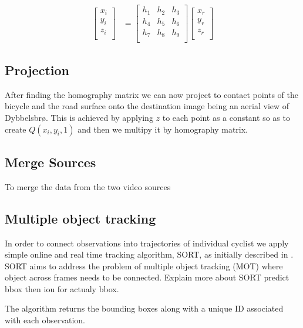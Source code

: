 \documentclass[
10pt, %
a4paper, %
oneside, %
headinclude,footinclude, %
] {book}%
\begin{document}
\begin{align}
\label{eq:3}
  \begin{bmatrix}
    x_{i} \\
    y_{i} \\
    z_{i} \\
  \end{bmatrix}
  &= \begin{bmatrix}
      h_1 & h_2 & h_3 \\
      h_4 & h_5 & h_6 \\
      h_7 & h_8 & h_9 \\
  \end{bmatrix}
  \begin{bmatrix}
    x_{r} \\
    y_{r} \\
    z_{r} \\
  \end{bmatrix}
\end{align}
\subsection{Projection}

After finding the homography matrix we can now project to contact points of the bicycle and the road surface onto the destination
image being an aerial view of Dybbelsbrø. This is achieved by applying $z$ to each point as a constant so as to create $Q(x_i, y_i, 1)$ and then we multipy it by 
homography matrix. 
\ \\
\subsection{Merge Sources}

To merge the data from the two video sources
\ \\
\subsection{Multiple object tracking}

In order to connect observations into trajectories of individual cyclist we apply 
simple online and real time tracking algorithm, SORT, as initially described in \cite{Bewley2016_sort}. 
SORT aims to address the problem of multiple object tracking (MOT) where object across frames needs to be connected. 
Explain more about SORT predict bbox then iou for actualy bbox.

The algorithm returns the bounding boxes along with a unique ID associated with each observation.
\end{document}
